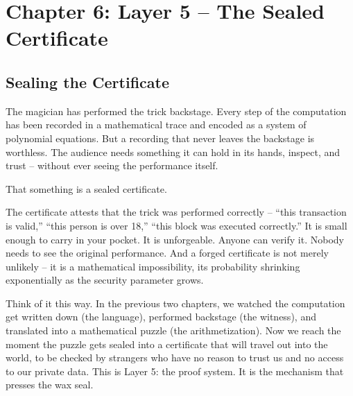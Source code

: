 \documentclass[
  11pt,
  openany]{report}
\begin{document}
\chapter{Chapter 6: Layer 5 -- The Sealed
Certificate}\label{chapter-6-layer-5-the-sealed-certificate}

\section{Sealing the Certificate}\label{sealing-the-certificate}

The magician has performed the trick backstage. Every step of the computation
has been recorded in a mathematical trace and encoded as a system of polynomial
equations. But a recording that never leaves the backstage is worthless. The
audience needs something it can hold in its hands, inspect, and trust -- without
ever seeing the performance itself.

That something is a sealed certificate.

The certificate attests that the trick was performed correctly -- ``this
transaction is valid,'' ``this person is over 18,'' ``this block was executed
correctly.'' It is small enough to carry in your pocket. It is unforgeable.
Anyone can verify it. Nobody needs to see the original performance. And a forged
certificate is not merely unlikely -- it is a mathematical impossibility, its
probability shrinking exponentially as the security parameter grows.

Think of it this way. In the previous two chapters, we watched the computation
get written down (the language), performed backstage (the witness), and
translated into a mathematical puzzle (the arithmetization). Now we reach the
moment the puzzle gets sealed into a certificate that will travel out into the
world, to be checked by strangers who have no reason to trust us and no access
to our private data. This is Layer 5: the proof system. It is the mechanism that
presses the wax seal.
\end{document}
